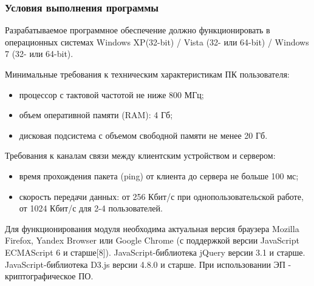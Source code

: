 \documentclass[a4paper]{extarticle}
\numberwithin{equation}{section}
\begin{document}
\subsubsection{Условия выполнения программы}
Разрабатываемое программное обеспечение должно функционировать в операционных системах Windows XP(32-bit) / Vista (32- или 64-bit) / Windows 7 (32- или 64-bit).\par
Минимальные требования к техническим характеристикам ПК пользователя:\par
\begin{itemize}
  \item процессор с тактовой частотой не ниже 800 МГц;
  \item объем оперативной памяти (RAM): 4 Гб;
  \item дисковая подсистема с объемом свободной памяти не менее 20 Гб.
\end{itemize}\par
Требования к каналам связи между клиентским устройством и сервером:\par
\begin{itemize}
  \item время прохождения пакета (ping) от клиента до сервера не больше 100 мс;
  \item скорость передачи данных: от 256 Кбит/с при однопользовательской работе, от 1024 Кбит/с для 2-4 пользователей.
\end{itemize}\par
Для функционирования модуля необходима актуальная версия браузера Mozilla Firefox, Yandex Browser или Google Chrome (с поддержкой версии JavaScript ECMAScript 6 и старше[8]). JavaScript-библиотека jQuery версии 3.1 и старше. JavaScript-библиотека D3.js версии 4.8.0 и старше. При использовании ЭП - криптографическое ПО.
\end{document}
